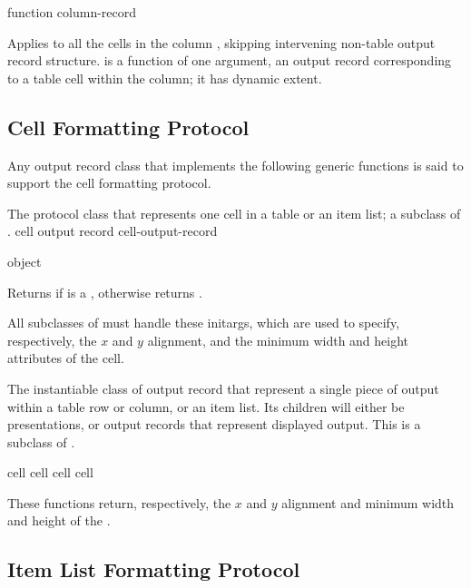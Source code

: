  {function column-record}

Applies  to all the cells in the column ,
skipping intervening non-table output record structure.   is a
function of one argument, an output record corresponding to a table cell within
the column; it has dynamic extent.


\subsection {Cell Formatting Protocol}

Any output record class that implements the following generic functions is said
to support the cell formatting protocol.


The protocol class that represents one cell in a table or an item list; a
subclass of .
 {cell output record} {cell-output-record}

 {object}

Returns  if  is a , otherwise
returns .


All subclasses of  must handle these initargs, which are
used to specify, respectively, the $x$ and $y$ alignment, and the minimum width
and height attributes of the cell.


The instantiable class of output record that represent a single piece of output
within a table row or column, or an item list.  Its children will either be
presentations, or output records that represent displayed output.  This is a
subclass of .

 {cell}
 {cell}
  {cell}
 {cell}

These functions return, respectively, the $x$ and $y$ alignment and minimum
width and height of the  .


\subsection {Item List Formatting Protocol}

